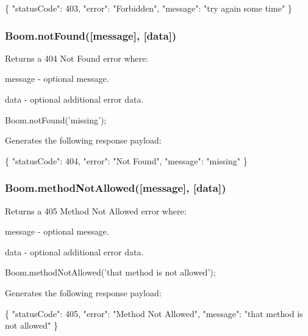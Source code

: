 \begin{DoxyCode}
\{
    "statusCode": 403,
    "error": "Forbidden",
    "message": "try again some time"
\}
\end{DoxyCode}


\subsubsection*{{\ttfamily Boom.\+not\+Found(\mbox{[}message\mbox{]}, \mbox{[}data\mbox{]})}}

Returns a 404 Not Found error where\+:
\begin{DoxyItemize}
\item {\ttfamily message} -\/ optional message.
\item {\ttfamily data} -\/ optional additional error data.
\end{DoxyItemize}


\begin{DoxyCode}
Boom.notFound('missing');
\end{DoxyCode}


Generates the following response payload\+:


\begin{DoxyCode}
\{
    "statusCode": 404,
    "error": "Not Found",
    "message": "missing"
\}
\end{DoxyCode}


\subsubsection*{{\ttfamily Boom.\+method\+Not\+Allowed(\mbox{[}message\mbox{]}, \mbox{[}data\mbox{]})}}

Returns a 405 Method Not Allowed error where\+:
\begin{DoxyItemize}
\item {\ttfamily message} -\/ optional message.
\item {\ttfamily data} -\/ optional additional error data.
\end{DoxyItemize}


\begin{DoxyCode}
Boom.methodNotAllowed('that method is not allowed');
\end{DoxyCode}


Generates the following response payload\+:


\begin{DoxyCode}
\{
    "statusCode": 405,
    "error": "Method Not Allowed",
    "message": "that method is not allowed"
\}
\end{DoxyCode}



